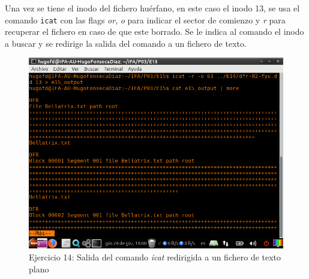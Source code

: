 \documentclass[11pt]{article}
\begin{document}
Una vez se tiene el inodo del fichero huérfano, en este caso el inodo 13, se usa el comando \verb|icat| con las flags \textit{or}, \textit{o} para indicar el sector de comienzo y \textit{r} para recuperar el fichero en caso de que este borrado. Se le indica al comando el inodo a buscar y se redirige la salida del comando a un fichero de texto.

\begin{figure}[H]
    \caption{Ejercicio 14: Salida del comando \textit{icat} redirigida a un fichero de texto plano}
    \centering
    \includegraphics[scale=0.7]{e15-2.png}
\end{figure}



\begin{thebibliography}{8}
\end{thebibliography}
\end{document}
